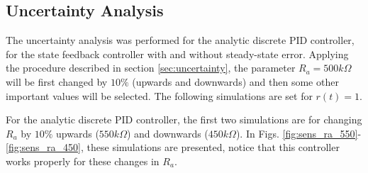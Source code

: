 \subsection{Uncertainty Analysis}
The uncertainty analysis was performed for the analytic discrete PID controller, for the state feedback controller with and without steady-state error. Applying the procedure described in section \ref{sec:uncertainty}, the parameter $R_a=500k\Omega$ will be first changed by $10\%$ (upwards and downwards) and then some other important values will be selected. The following simulations are set for $r(t)=1$.

For the analytic discrete PID controller, the first two simulations are for changing $R_a$ by $10\%$ upwards ($550k\Omega$) and downwards ($450k\Omega$). In Figs. \ref{fig:sens_ra_550}-\ref{fig:sens_ra_450}, these simulations are presented, notice that this controller works properly for these changes in $R_a$.

